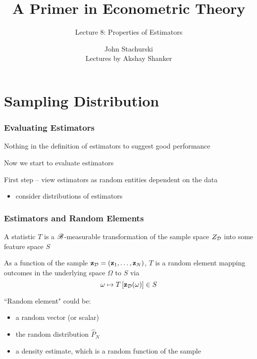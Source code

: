 





\title{A Primer in Econometric Theory}

\subtitle
{Lecture 8: Properties of Estimators}

\author{John Stachurski \\ \tiny Lectures by Akshay Shanker}




\begin{frame}
  \titlepage
\end{frame}

\section{Sampling Distribution}

\begin{frame}\frametitle{Evaluating Estimators}

    \vspace{2em}
    Nothing in the definition of estimators to suggest good performance 
    
    Now we start to evaluate estimators
    
    First step -- view estimators as random entities dependent on the data
    \begin{itemize}
      \item consider distributions of estimators 
    \end{itemize}
 
\end{frame}

\begin{frame}\frametitle{Estimators and Random Elements}

    \vspace{2em}
    A statistic $T$ is a $\mathscr B$-measurable transformation of
   the sample space $Z_{\mathcal D}$ into some feature space $S$

    \vspace{.7em}
    As a function of the
    sample $\mathbf{z}_{\mathcal D}  = ({\mathbf z}_1,
    \ldots, {\mathbf z}_N)$, $T$ is a random element mapping outcomes
    in the underlying space $\Omega$ to $S$ via
    \begin{equation*}
        \omega \mapsto 
        T \left[ \mathbf{z}_{\mathcal D}(\omega) \right] \in S
    \end{equation*}

    ``Random element" could be:
    \begin{itemize}
        \item a random vector (or scalar)
        \item the random distribution $\hat P_N$
        \item a density estimate, which is a random function of the sample
    \end{itemize}

\end{frame}

